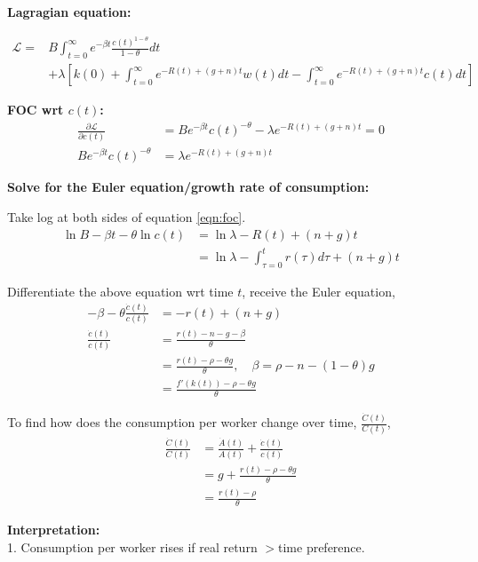 \documentclass[12pt]{article}
\begin{document}
{\textbf {Lagragian equation:}}

\begin{align*}
\mathscr{L} =& B \int_{t = 0}^{\infty } e^{ - \beta t} \frac{c(t)^{1 - \theta}}
{1 - \theta} dt\\
& + \lambda \left[ 
k(0) + \int_{t = 0}^{\infty } e^{ - R(t) + (g + n)t}w(t)d t  - 
\int_{t = 0}^{\infty } e^{ - R(t) + (g + n)t}c(t) d t
\right] 
\end{align*}

{\textbf {FOC wrt $ c(t) $:}}
\begin{align}
\frac{\partial \mathscr{L} }{\partial c(t) }&=
Be^{ - \beta t}c(t)^{ - \theta} - \lambda e^{ - R(t) + (g + n)t} = 0\\
\label{eqn:foc}
Be^{ - \beta t}c(t)^{ - \theta}&= \lambda e^{ - R(t) + (g + n)t}
\end{align}


{\textbf {Solve for the Euler equation/growth rate of consumption:}}

Take log at both sides of equation \eqref{eqn:foc}.
\begin{align*}
\ln B - \beta t - \theta \ln c(t)&= \ln \lambda - R(t) + (n + g)t\\
&= \ln \lambda - \int_{\tau = 0}^{t}r(\tau)d \tau + (n + g)t 
\end{align*}

Differentiate the above equation wrt time $ t $, receive the Euler equation,
\begin{align*}
 - \beta - \theta \frac{\dot{c}(t)}{c(t)}&=  - r(t) + (n + g)\\
 \frac{\dot{c}(t)}{c(t)}&= \frac{r(t) - n - g - \beta}{\theta}\\
 &= \frac{r(t) - \rho - \theta g}{\theta}, \quad \beta = \rho - n - (1 - \theta)g\\
 &= \frac{f'(k(t)) - \rho - \theta g}{\theta}
\end{align*}



To find how does the consumption per worker change over time, $ \frac{\dot{C}(t)}{
C(t)} $,
\begin{align*}
\frac{\dot{C}(t)}{C(t)}&= \frac{\dot{A}(t)}{A(t)} + \frac{\dot{c}(t)}{c(t)}\\
&= g + \frac{r(t) - \rho - \theta g}{\theta}\\
&= \frac{r(t) - \rho}{\theta}
\end{align*}

{\textbf {Interpretation:}}\\
1. Consumption per worker rises if real return $ > $time preference.
\end{document}
